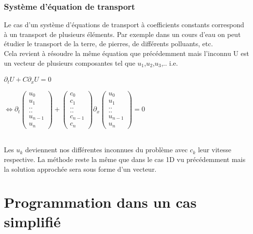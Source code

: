\documentclass[12pt]{article}
\begin{document}
\subsubsection{Système d'équation de transport}
Le cas d'un système d'équations de transport à coefficients constants correspond à un transport de plusieurs éléments. Par exemple dans un cours d'eau on peut étudier le transport de la terre, de pierres, de différents polluants, etc.
\\Cela revient à résoudre la même équation que précédemment mais l'inconnu U est un vecteur de plusieurs composantes tel que $u_1$,$u_2$,$u_3$,..
i.e.
\\
\begin{center}
    $ \partial_t U + C\partial_x U = 0$
\end{center}
\begin{center}
$ \Leftrightarrow \partial_t \begin{pmatrix}
  u_0\\
  u_1\\
  ..\\
  ..\\
  u_{n-1}\\
  u_n
\end{pmatrix}+        \begin{pmatrix}
  c_0\\
  c_1\\
  ..\\
  ..\\
  c_{n-1}\\
  c_n
\end{pmatrix}\partial_x\begin{pmatrix}
  u_0\\
  u_1\\
  ..\\
  ..\\
  u_{n-1}\\
  u_n
\end{pmatrix} =0 $
\end{center}
\leavevmode\\
\noindent Les $u_k$ deviennent nos différentes inconnues du problème avec $c_k$ leur vitesse respective. La méthode reste la même que dans le cas 1D vu précédemment mais la solution approchée sera sous forme d'un vecteur.
\\
\section{Programmation dans un cas simplifié}
\end{document}
